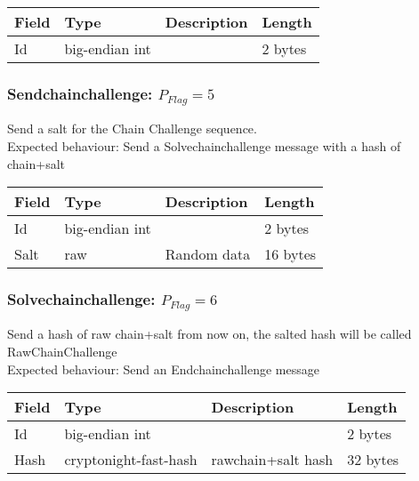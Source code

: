 \documentclass[a4paper,10pt]{article}
\begin{document}
                \noindent\begin{tabularx}{\textwidth}{|l|l|X|l|}
                    \hline Field & Type & Description & Length \\ \hline
                    \hline Id & big-endian int & & 2 bytes \\
                    \hline
                \end{tabularx}

            \subsubsection{Sendchainchallenge: $P_{Flag} = 5$}
                Send a salt for the Chain Challenge sequence.\\
                Expected behaviour: Send a Solvechainchallenge message with a hash of chain+salt\\
                
                \noindent\begin{tabularx}{\textwidth}{|l|l|X|l|}
                    \hline Field & Type & Description & Length \\ \hline
                    \hline Id & big-endian int & & 2 bytes \\
                    \hline Salt & raw & Random data & 16 bytes \\
                    \hline
                \end{tabularx}
            
            \subsubsection{Solvechainchallenge: $P_{Flag} = 6$}
                Send a hash of raw chain+salt from now on, the salted hash will be called RawChainChallenge\\
                Expected behaviour: Send an Endchainchallenge message\\
                
                \noindent\begin{tabularx}{\textwidth}{|l|l|X|l|}
                    \hline Field & Type & Description & Length \\ \hline
                    \hline Id & big-endian int & & 2 bytes \\
                    \hline Hash & cryptonight-fast-hash & rawchain+salt hash & 32 bytes \\
                    \hline
                \end{tabularx}
            
\end{document}
